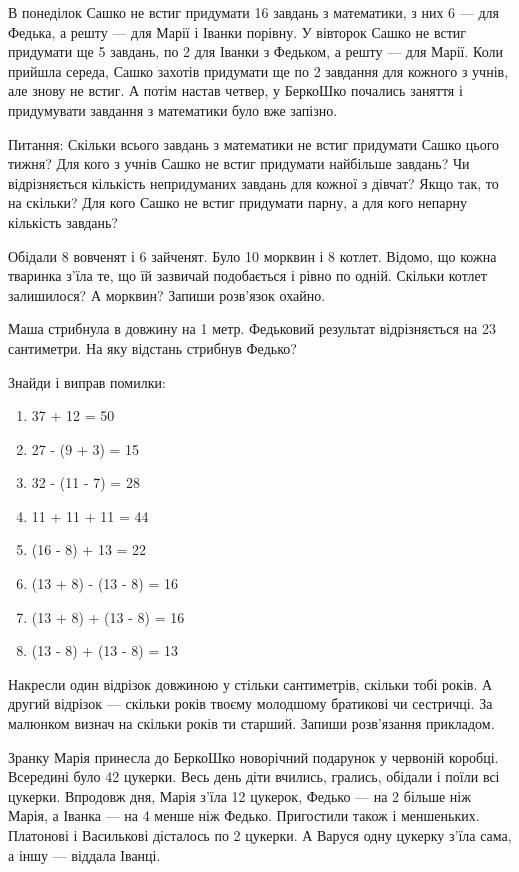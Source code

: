 \problem
В понеділок Сашко не встиг придумати 16 завдань з математики,
з них 6 --- для Федька, а решту --- для Марії і Іванки порівну. 
У вівторок Сашко не встиг придумати ще 5 завдань,
по 2 для Іванки з Федьком, а решту --- для Марії. 
Коли прийшла середа, Сашко захотів придумати
ще по 2 завдання для кожного з учнів, але знову не встиг. 
А потім настав четвер, у БеркоШко почались заняття
і придумувати завдання з математики було вже запізно.

Питання:
Скільки всього завдань з математики не встиг придумати Сашко цього тижня?
Для кого з учнів Сашко не встиг придумати найбільше завдань?
Чи відрізняється кількість непридуманих завдань для кожної з дівчат?
Якщо так, то на скільки?
Для кого Сашко не встиг придумати парну, а для кого непарну кількість завдань?


\problem
Обідали 8 вовченят і 6 зайченят. Було 10 морквин і 8 котлет.
Відомо, що кожна тваринка з'їла те, що їй зазвичай подобається
і рівно по одній.
Скільки котлет залишилося? А морквин? Запиши розв'язок охайно.


\problem
Маша стрибнула в довжину на 1 метр.
Федьковий результат відрізняється на 23 сантиметри.
На яку відстань стрибнув Федько?


\problem
Знайди і виправ помилки:
\begin{multicols}{2}
    \begin{enumerate}
        \item 37 + 12 = 50
        \item 27 - (9 + 3) = 15
        \item 32 - (11 - 7) = 28
        \item 11 + 11 + 11 = 44
        \item (16 - 8) + 13 = 22
        \item (13 + 8) - (13 - 8) = 16
        \item (13 + 8) + (13 - 8) = 16
        \item (13 - 8) + (13 - 8) = 13
    \end{enumerate}
\end{multicols}


\problem
Накресли один відрізок довжиною у стільки сантиметрів, скільки тобі років.
А другий відрізок --- скільки років твоєму молодшому братикові чи сестричці.
За малюнком визнач на скільки років ти старший.
Запиши розв’язання прикладом.


\problem
Зранку Марія принесла до БеркоШко новорічний подарунок у червоній коробці.
Всередині було 42 цукерки.
Весь день діти вчились, грались, обідали і поїли всі цукерки.
Впродовж дня, Марія з’їла 12 цукерок, Федько --- на 2 більше ніж Марія,
а Іванка --- на 4 менше ніж Федько.
Пригостили також і меншеньких. Платонові і Василькові дісталось по 2 цукерки.
А Варуся одну цукерку з’їла сама, а іншу --- віддала Іванці.

